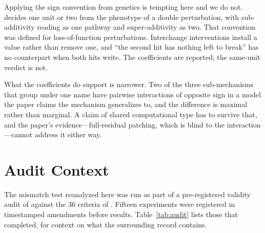 \documentclass{article}
\begin{document}
Applying the sign convention from genetics is tempting here and we do not. \citet{benzer1955} decides one unit or two from the phenotype of a double perturbation, with sub-additivity reading as one pathway and super-additivity as two. That convention was defined for loss-of-function perturbations. Interchange interventions install a value rather than remove one, and ``the second hit has nothing left to break'' has no counterpart when both hits write. The coefficients are reported; the same-unit verdict is not.

What the coefficients do support is narrower. Two of the three sub-mechanisms that \citet{prakash2025lookback} group under one name have pairwise interactions of opposite sign in a model the paper claims the mechanism generalizes to, and the difference is maximal rather than marginal. A claim of shared computational type has to survive that, and the paper's evidence---full-residual patching, which is blind to the interaction---cannot address it either way.


\section{Audit Context}

The mismatch test reanalyzed here was run as part of a pre-registered validity audit of \citet{prakash2025lookback} against the 36 criteria of \citet{tower2026mechval}. Fifteen experiments were registered in timestamped amendments before results. Table~\ref{tab:audit} lists those that completed, for context on what the surrounding record contains.
\end{document}
